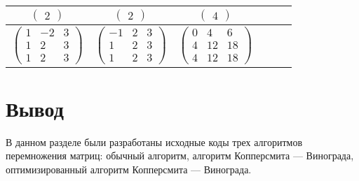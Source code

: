 \begin{table}[h!]
\begin{center}
\begin{threeparttable}
\begin{tabular}{|c|c|c|c|c|c|}
                \hline
                $\begin{pmatrix}
                     2
                \end{pmatrix}$ &
                $\begin{pmatrix}
                     2
                \end{pmatrix}$ &
                $\begin{pmatrix}
                     4
                \end{pmatrix}$ \\
                \hline
                $\begin{pmatrix}
                     1 & -2 & 3\\
                     1 & 2 & 3\\
                     1 & 2 & 3
                \end{pmatrix}$ &
                $\begin{pmatrix}
                     -1 & 2 & 3\\
                     1 & 2 & 3\\
                     1 & 2 & 3
                \end{pmatrix}$ &
                $\begin{pmatrix}
                     0 & 4 & 6\\
                     4 & 12 & 18\\
                     4 & 12 & 18
                \end{pmatrix}$\\
                \hline
            \end{tabular}
        \end{threeparttable}
    \end{center}
\end{table}

\section*{Вывод}

В данном разделе были разработаны исходные коды трех алгоритмов перемножения матриц: обычный алгоритм, алгоритм Копперсмита — Винограда, оптимизированный алгоритм Копперсмита — Винограда.
